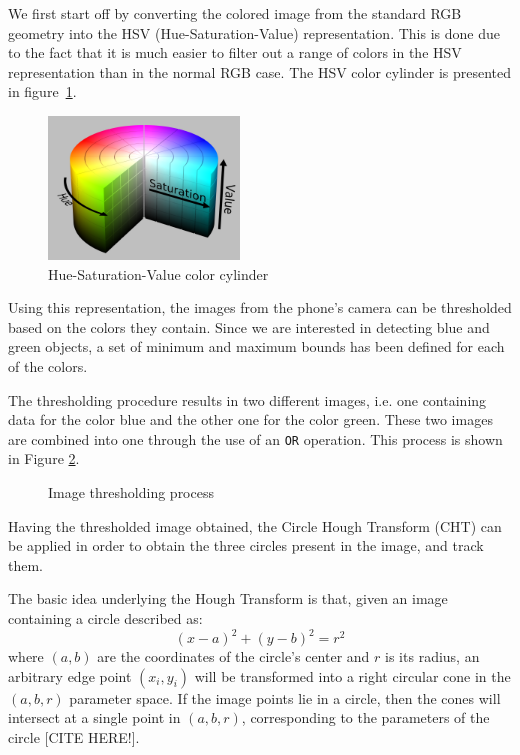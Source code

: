 \documentclass[journal]{IEEEtran}
\let\MYoriglatexcaption\caption
\renewcommand{\caption}[2][\relax]{\MYoriglatexcaption[#2]{#2}}
\begin{document}
We first start off by converting the colored image from the standard RGB geometry into the HSV (Hue-Saturation-Value) representation. This is done due to the fact that it is much easier to filter out a range of colors in the HSV representation than in the normal RGB case. The HSV color cylinder is presented in figure~\ref{fig:sim}.

\begin{figure}[!htpb]
\centering
\includegraphics[width=2in]{images/hsv_representation}
\caption{Hue-Saturation-Value color cylinder}
\label{fig:sim}
\end{figure}

Using this representation, the images from the phone's camera can be thresholded based on the colors they contain. Since we are interested in detecting blue and green objects, a set of minimum and maximum bounds has been defined for each of the colors.

The thresholding procedure results in two different images, i.e. one containing data for the color blue and the other one for the color green. These two images are combined into one through the use of an \texttt{OR} operation. This process is shown in Figure \ref{fig:thresh}.
\begin{figure}[!htpb]
\centering
\caption{Image thresholding process}
\label{fig:thresh}
\end{figure}

Having the thresholded image obtained, the Circle Hough Transform (CHT) can be applied in order to obtain the three circles present in the image, and track them.

The basic idea underlying the Hough Transform is that, given an image containing a circle described as:
\begin{equation}
\left(x-a\right)^2 + \left(y-b\right)^2 = r^2
\end{equation}
where $(a,b)$ are the coordinates of the circle's center and $r$ is its radius, an arbitrary edge point $(x_i, y_i)$ will be transformed into a right circular cone in the $(a,b,r)$ parameter space. If the image points lie in a circle, then the cones will intersect at a single point in $(a,b,r)$, corresponding to the parameters of the circle [CITE HERE!].
\end{document}
